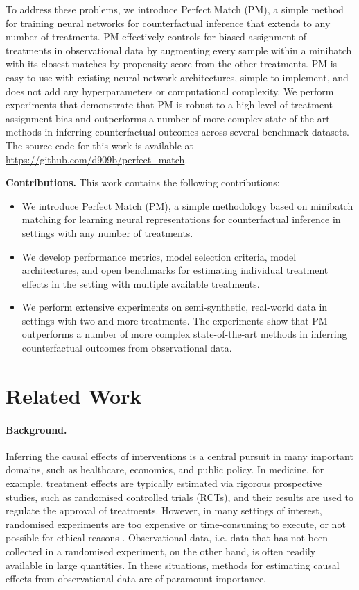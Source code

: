 \documentclass{article}
\begin{document}
To address these problems, we introduce Perfect Match (PM), a simple method for training neural networks for counterfactual inference that extends to any number of treatments. PM effectively controls for biased assignment of treatments in observational data by augmenting every sample within a minibatch with its closest matches by propensity score from the other treatments. PM is easy to use with existing neural network architectures, simple to implement, and does not add any hyperparameters or computational complexity. We perform experiments that demonstrate that PM is robust to a high level of treatment assignment bias and outperforms a number of more complex state-of-the-art methods in inferring counterfactual outcomes across several benchmark datasets. The source code for this work is available at \url{https://github.com/d909b/perfect\_match}. 

\noindent\textbf{Contributions.} This work contains the following contributions:
\begin{itemize}[noitemsep,leftmargin=2.2ex]
\item We introduce Perfect Match (PM), a simple methodology based on minibatch matching for learning neural representations for counterfactual inference in settings with any number of treatments. 
\item We develop performance metrics, model selection criteria, model architectures, and open benchmarks for estimating individual treatment effects in the setting with multiple available treatments.
\item We perform extensive experiments on semi-synthetic, real-world data in settings with two and more treatments. The experiments show that PM outperforms a number of more complex state-of-the-art methods in inferring counterfactual outcomes from observational data.
\end{itemize}

\section{Related Work}
\label{sec:related_work}
\paragraph{Background.} Inferring the causal effects of interventions is a central pursuit in many important domains, such as healthcare, economics, and public policy. In medicine, for example, treatment effects are typically estimated via rigorous prospective studies, such as randomised controlled trials (RCTs), and their results are used to regulate the approval of  treatments. However, in many settings of interest, randomised experiments are too expensive or time-consuming to execute, or not possible for ethical reasons \cite{carpenter2014reputation,bothwell2016rct}. Observational data, i.e. data that has not been collected in a randomised experiment, on the other hand, is often readily available in large quantities. In these situations, methods for estimating causal effects from observational data are of paramount importance.
\end{document}
